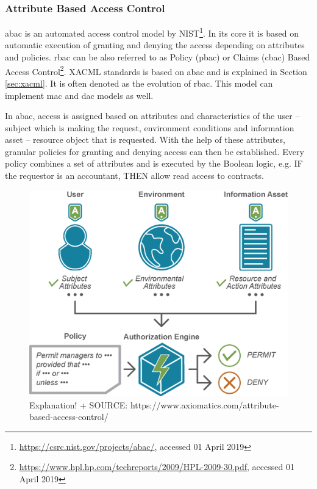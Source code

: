 \subsubsection{Attribute Based Access Control} \label{ABAC_SOTA}

\acrfull{abac} is an automated access control model by NIST\footnote{\url{https://csrc.nist.gov/projects/abac/}, accessed 01 April 2019}. In its core it is based on automatic execution of granting and denying the access depending on attributes and policies. \acrshort{rbac} can be also referred to as Policy (\acrshort{pbac}) or Claims (\acrshort{cbac}) Based Access Control\footnote{\url{https://www.hpl.hp.com/techreports/2009/HPL-2009-30.pdf}, accessed 01 April 2019}. XACML standards is based on \acrshort{abac} and is explained in Section \ref{sec:xacml}. It is often denoted as the evolution of \acrshort{rbac}. This model can implement \acrshort{mac} and \acrshort{dac} models as well.

In \acrshort{abac}, access is assigned based on attributes and characteristics of the user – subject which is making the request, environment conditions and information asset – resource object that is requested. With the help of these attributes, granular policies for granting and denying access can then be established. Every policy combines a set of attributes and is executed by the Boolean logic, e.g. IF the requestor is an accountant, THEN allow read access to contracts.

\begin{figure}[ht]
    \centering
    \includegraphics[width=.7\textwidth]{00images/ABAC}
    \caption{Explanation! + SOURCE: https://www.axiomatics.com/attribute-based-access-control/}
    \label{fig:ABAC_diagram_sota}
\end{figure}